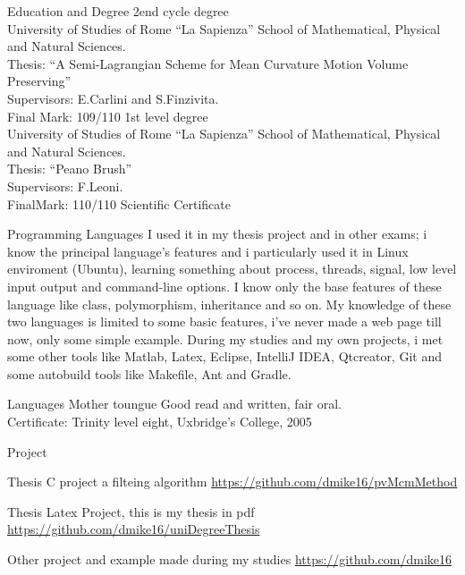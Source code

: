 \documentclass[a4paper,11pt,noweblinkbox=true,eventconfortaa]{dmCV}
\begin{document}
\address{Via Prenestina 226}
\personaldata
\begin{eventlist}{Education and Degree}
  {\scriptsize 2end cycle degree}\\
 University of Studies of Rome ``La Sapienza'' School of 
 Mathematical, Physical and Natural Sciences.\\
 Thesis: ``A Semi-Lagrangian Scheme for Mean Curvature Motion Volume
 Preserving''\\  
 Supervisors: E.Carlini and  S.Finzivita.\\
 Final Mark: 109/110
  {\scriptsize 1st level degree}\\
 University of Studies of Rome ``La Sapienza'' School of 
 Mathematical, Physical and Natural Sciences.\\
 Thesis: ``Peano Brush''\\
 Supervisors: F.Leoni.\\ 
 FinalMark: 110/110
       {\scriptsize Scientific Certificate}
\end{eventlist}

\begin{eventlist}{Programming Languages}
   I used it in my thesis project and
  in other exams; i know the principal language's features and i particularly
  used it in Linux enviroment (Ubuntu), learning something about process, 
  threads, signal, low level input output and command-line options. 
   I know only the base features of
  these language like class, polymorphism, inheritance and so on.
   My knowledge of these two
  languages is limited to some basic features, i've never made a web
  page till now, only some simple example.
   During my studies and my own projects, i
  met some other tools like Matlab, Latex, Eclipse, IntelliJ IDEA,
  Qtcreator, Git and some autobuild tools like Makefile, Ant and Gradle.
\end{eventlist}

\begin{eventlist}{Languages}
   Mother toungue
   Good read and written, fair oral.\\
  Certificate: Trinity level eight, Uxbridge's College, 2005
\end{eventlist}

\begin{eventlist}{Project}
  \item Thesis C project a filteing algorithm {\scriptsize\url{https://github.com/dmike16/pvMcmMethod}}
  \item Thesis Latex Project, this is my thesis in pdf {\scriptsize\url{https://github.com/dmike16/uniDegreeThesis}}
  \item Other project and example made during my studies {\scriptsize\url{https://github.com/dmike16}}
\end{eventlist}
\end{document}
